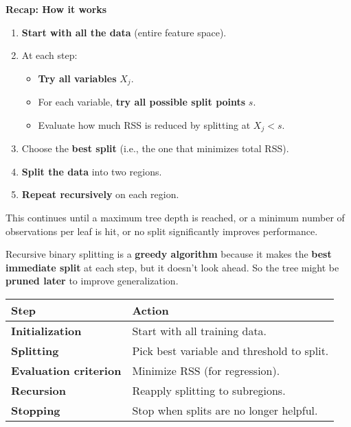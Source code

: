 \newpage

\begin{flushleft}
    \textcolor{Green3}{ \textbf{Recap: How it works}}
\end{flushleft}
\begin{enumerate}
    \item \textbf{Start with all the data} (entire feature space).
    \item At each step:
    \begin{itemize}
        \item \textbf{Try all variables} $X_j$.
        \item For each variable, \textbf{try all possible split points} $s$.
        \item Evaluate how much RSS is reduced by splitting at $X_j < s$.
    \end{itemize}
    \item Choose the \textbf{best split} (i.e., the one that minimizes total RSS).
    \item \textbf{Split the data} into two regions.
    \item \textbf{Repeat recursively} on each region.
\end{enumerate}
This continues until a maximum tree depth is reached, or a minimum number of observations per leaf is hit, or no split significantly improves performance.

\highspace
Recursive binary splitting is a \textbf{greedy algorithm} because it makes the \textbf{best immediate split} at each step, but it doesn't look ahead. So the tree might be \textbf{pruned later} to improve generalization.

\begin{table}[!htp]
    \centering
    \begin{tabular}{@{} l l @{}}
        \toprule
        Step & Action \\
        \midrule
        \textbf{Initialization}       & Start with all training data.              \\ [.5em]
        \textbf{Splitting}            & Pick best variable and threshold to split. \\ [.5em]
        \textbf{Evaluation criterion} & Minimize RSS (for regression).             \\ [.5em]
        \textbf{Recursion}            & Reapply splitting to subregions.           \\ [.5em]
        \textbf{Stopping}             & Stop when splits are no longer helpful.    \\
        \bottomrule
    \end{tabular}
\end{table}